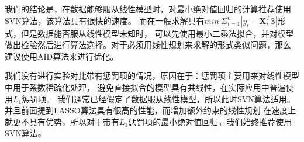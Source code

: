 我们的结论是，在数据能够服从线性模型时，对最小绝对值回归的计算推荐使用SVN算法，该算法具有很快的速度。
而在一般求解具有$min\ \Sigma_{i=1}^{n} |y_i - \bm{X}_i^T\bm{\beta}|$形式，但是数据能否服从线性模型未知时，
可以先使用最小二乘法拟合，并对模型做出检验然后进行算法选择。对于必须用线性规划来求解的形式类似问题，那么
建议使用AID算法来进行优化。

我们没有进行实验对比带有惩罚项的情况，原因在于：惩罚项主要用来对线性模型中用于系数稀疏化处理，
避免直接拟合的模型具有共线性，在实际应用中普遍使用$L_1$惩罚项。
我们通常已经假定了数据服从线性模型，所以此时SVN算法适用。并且前面提到LASSO算法具有很高的性能，而增加额外约束的线性规划
在速度上就更不具有优势，所以对于带有$L_1$惩罚项的最小绝对值回归，我们始终推荐使用SVN算法。






